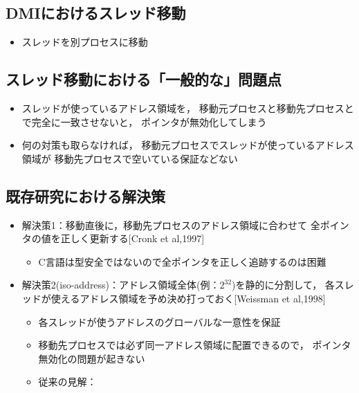 \documentclass[25pt,papersize,landscape]{jsarticle}
\begin{document}
\subsection{DMIにおけるスレッド移動}

\begin{itemize}
\item スレッドを別プロセスに移動
\end{itemize}


\subsection{スレッド移動における「一般的な」問題点}

\begin{itemize}
\item スレッドが使っているアドレス領域を，
  移動元プロセスと移動先プロセスとで完全に一致させないと，
  ポインタが無効化してしまう
\item 何の対策も取らなければ，
  移動元プロセスでスレッドが使っているアドレス領域が
  移動先プロセスで空いている保証などない
\end{itemize}


\subsection{既存研究における解決策}

\begin{itemize}
\item 解決策1：移動直後に，移動先プロセスのアドレス領域に合わせて
  全ポインタの値を正しく更新する{\scriptsize[Cronk et al,1997]}
  \begin{itemize}
  \item C言語は型安全ではないので全ポインタを正しく追跡するのは困難
  \end{itemize}
\item 解決策2(iso-address)：アドレス領域全体(例：$2^{32}$)を静的に分割して，
  各スレッドが使えるアドレス領域を予め決め打っておく{\scriptsize[Weissman et al,1998]}
  \begin{itemize}
  \item 各スレッドが使うアドレスのグローバルな一意性を保証
  \item 移動先プロセスでは必ず同一アドレス領域に配置できるので，
    ポインタ無効化の問題が起きない
  \item 従来の見解：
  \end{itemize}
\end{itemize}
\end{document}
